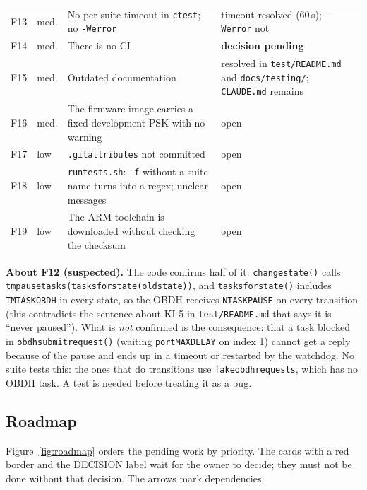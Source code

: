 \documentclass[11pt,a4paper]{article}
\DeclareRobustCommand{\_}{\textunderscore\allowbreak}
\newcommand{\cd}[1]{\texttt{#1}}
\begin{document}
\begin{longtable}{@{}l l>{\raggedright\arraybackslash}p{9.6cm}>{\raggedright\arraybackslash}p{4.3cm}@{}}
F13 & med. & No per-suite timeout in \cd{ctest}; no \cd{-Werror} & timeout resolved (60\,s); \cd{-Werror} not\\
F14 & med. & There is no CI & \textbf{decision pending}\\
F15 & med. & Outdated documentation & resolved in \cd{test/README.md} and \cd{docs/testing/}; \cd{CLAUDE.md} remains\\
F16 & med. & The firmware image carries a fixed development PSK with no warning & open\\
F17 & low & \cd{.gitattributes} not committed & open\\
F18 & low & \cd{run\_tests.sh}: \cd{-f} without a suite name turns into a regex; unclear messages & open\\
F19 & low & The ARM toolchain is downloaded without checking the checksum & open\\
\end{longtable}
\endgroup

\textbf{About F12 (suspected).} The code confirms half of it: \cd{change\_state()} calls
\cd{tm\_pause\_tasks(tasks\_for\_state(old\_state))}, and \cd{tasks\_for\_state()} includes
\cd{TM\_TASK\_OBDH} in every state, so the OBDH receives \cd{N\_TASK\_PAUSE} on every transition
(this contradicts the sentence about KI-5 in \cd{test/README.md} that says it is ``never paused''). What is
\emph{not} confirmed is the consequence: that a task blocked in \cd{obdh\_submit\_request()}
(waiting \cd{portMAX\_DELAY} on index 1) cannot get a reply because of the pause and ends up in a timeout or
restarted by the watchdog. No suite tests this: the ones that do transitions use
\cd{fake\_obdh\_requests}, which has no OBDH task. A test is needed before treating it as a bug.

\subsection{Roadmap}

Figure~\ref{fig:roadmap} orders the pending work by priority. The cards with a red border
and the DECISION label wait for the owner to decide; they must not be done without that
decision. The arrows mark dependencies.
\end{document}
